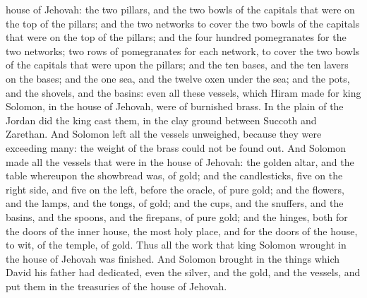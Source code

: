 house of Jehovah: the two pillars, and the two bowls of the capitals that were on the top of the pillars; and the two networks to cover the two bowls of the capitals that were on the top of the pillars; and the four hundred pomegranates for the two networks; two rows of pomegranates for each network, to cover the two bowls of the capitals that were upon the pillars; and the ten bases, and the ten lavers on the bases; and the one sea, and the twelve oxen under the sea; and the pots, and the shovels, and the basins: even all these vessels, which Hiram made for king Solomon, in the house of Jehovah, were of burnished brass. In the plain of the Jordan did the king cast them, in the clay ground between Succoth and Zarethan. And Solomon left all the vessels unweighed, because they were exceeding many: the weight of the brass could not be found out.  And Solomon made all the vessels that were in the house of Jehovah: the golden altar, and the table whereupon the showbread was, of gold; and the candlesticks, five on the right side, and five on the left, before the oracle, of pure gold; and the flowers, and the lamps, and the tongs, of gold; and the cups, and the snuffers, and the basins, and the spoons, and the firepans, of pure gold; and the hinges, both for the doors of the inner house, the most holy place, and for the doors of the house, to wit, of the temple, of gold.  Thus all the work that king Solomon wrought in the house of Jehovah was finished. And Solomon brought in the things which David his father had dedicated, even the silver, and the gold, and the vessels, and put them in the treasuries of the house of Jehovah. 

